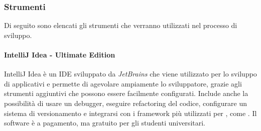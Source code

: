 

		\subsubsection{Strumenti}
			Di seguito sono elencati gli strumenti che verranno utilizzati nel processo di sviluppo.
							
				\paragraph{IntelliJ Idea - Ultimate Edition}
					IntelliJ Idea è un IDE sviluppato da \textit{JetBrains} che viene utilizzato per lo sviluppo di applicativi  e permette di agevolare ampiamente lo sviluppatore, grazie agli strumenti aggiuntivi che possono essere facilmente configurati.
					\newline
					Include anche la possibilità di usare un debugger, eseguire refactoring del codice, configurare un sistema di versionamento e integrarsi con i framework più utilizzati per , come .
					\newline
					Il software è a pagamento, ma gratuito per gli studenti universitari. 

